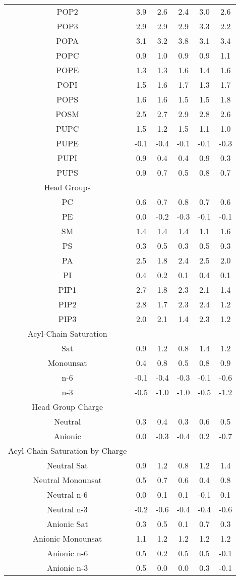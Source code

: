 \documentclass[9pt]{article}
\begin{document}
\begin{table}
{\begin{tabular}{| c || ccccc |}
POP2&3.9&2.6&2.4&3.0&2.6        \\
POP3&2.9&2.9&2.9&3.3&2.2        \\
POPA    &3.1&3.2&3.8&3.1&3.4        \\
POPC    &0.9&1.0&0.9&0.9&1.1        \\
POPE    &1.3&1.3&1.6&1.4&1.6        \\
POPI    &1.5&1.6&1.7&1.3&1.7        \\
POPS    &1.6&1.6&1.5&1.5&1.8        \\
POSM    &2.5&2.7&2.9&2.8&2.6        \\
PUPC    &1.5&1.2&1.5&1.1&1.0        \\
PUPE    &-0.1&-0.4&-0.1&-0.1&-0.3       \\
PUPI    &0.9&0.4&0.4&0.9&0.3        \\
PUPS    &0.9&0.7&0.5&0.8&0.7        \\
\hline
Head Groups &&&&&\\
PC      &0.6&0.7&0.8&0.7&0.6        \\
PE      &0.0&-0.2&-0.3&-0.1&-0.1       \\
SM      &1.4&1.4&1.4&1.1&1.6        \\
PS      &0.3&0.5&0.3&0.5&0.3        \\
PA      &2.5&1.8&2.4&2.5&2.0        \\
PI      &0.4&0.2&0.1&0.4&0.1        \\
PIP1&2.7&1.8&2.3&2.1&1.4        \\
PIP2&2.8&1.7&2.3&2.4&1.2        \\
PIP3&2.0&2.1&1.4&2.3&1.2        \\
\hline
Acyl-Chain Saturation &&&&&\\
Sat      &0.9&1.2&0.8&1.4&1.2        \\
Monounsat      &0.4&0.8&0.5&0.8&0.9        \\
n-6&-0.1&-0.4&-0.3&-0.1&-0.6       \\
n-3&-0.5&-1.0&-1.0&-0.5&-1.2       \\
\hline
Head Group Charge  &&&&&\\
Neutral &0.3&0.4&0.3&0.6&0.5        \\
Anionic &0.0&-0.3&-0.4&0.2&-0.7      \\
\hline
Acyl-Chain Saturation by Charge &&&&&\\
Neutral Sat    &0.9&1.2&0.8&1.2&1.4        \\
Neutral Monounsat    &0.5&0.7&0.6&0.4&0.8        \\
Neutral n-6&0.0&0.1&0.1&-0.1&0.1        \\
Neutral n-3&-0.2&-0.6&-0.4&-0.4&-0.6       \\
Anionic Sat     &0.3&0.5&0.1&0.7&0.3        \\
Anionic Monounsat    &1.1&1.2&1.2&1.2&1.2        \\
Anionic n-6&0.5&0.2&0.5&0.5&-0.1       \\
Anionic n-3&0.5&0.0&0.0&0.3&-0.1       \\\hline
\end{tabular}}
\end{table}
\end{document}

